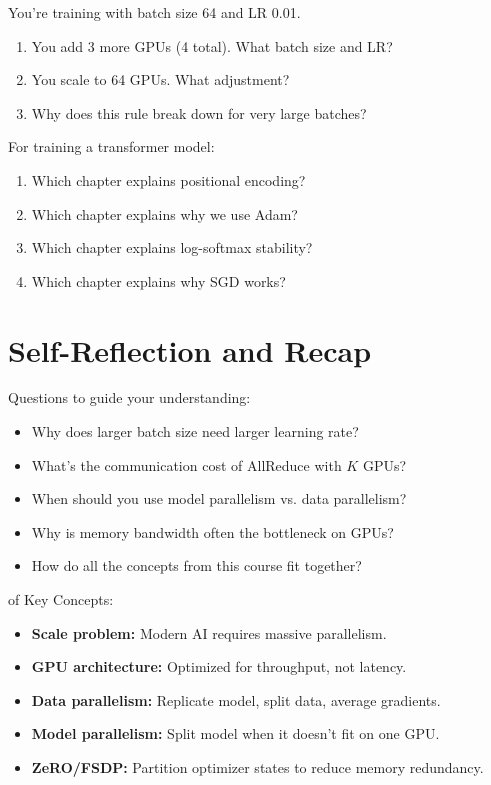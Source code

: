 \vspace{2em}
 You're training with batch size 64 and LR 0.01.
\begin{enumerate}
    \item You add 3 more GPUs (4 total). What batch size and LR?
    \item You scale to 64 GPUs. What adjustment?
    \item Why does this rule break down for very large batches?
\end{enumerate}


\vspace{2em}
 For training a transformer model:
\begin{enumerate}
    \item Which chapter explains positional encoding?
    \item Which chapter explains why we use Adam?
    \item Which chapter explains log-softmax stability?
    \item Which chapter explains why SGD works?
\end{enumerate}




\newpage
\section{Self-Reflection and Recap}

 Questions to guide your understanding:
\begin{itemize}
    \item Why does larger batch size need larger learning rate?
    \item What's the communication cost of AllReduce with $K$ GPUs?
    \item When should you use model parallelism vs. data parallelism?
    \item Why is memory bandwidth often the bottleneck on GPUs?
    \item How do all the concepts from this course fit together?
\end{itemize}

 of Key Concepts:
\begin{itemize}
    \item \textbf{Scale problem:} Modern AI requires massive parallelism.
    \item \textbf{GPU architecture:} Optimized for throughput, not latency.
    \item \textbf{Data parallelism:} Replicate model, split data, average gradients.
    \item \textbf{Model parallelism:} Split model when it doesn't fit on one GPU.
    \item \textbf{ZeRO/FSDP:} Partition optimizer states to reduce memory redundancy.
\end{itemize}


